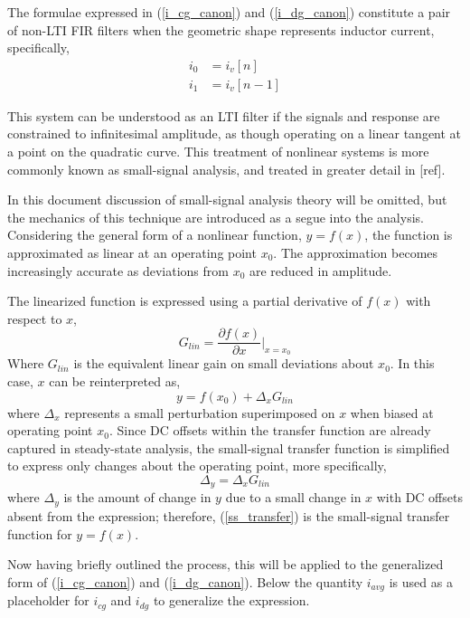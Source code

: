 \documentclass[conference]{IEEEtran}
\begin{document}
The formulae expressed in (\ref{i_cg_canon}) and (\ref{i_dg_canon}) constitute a pair of non-LTI FIR filters when the geometric shape represents inductor current, specifically,
\begin{align}
i_0 &= i_v[n] \nonumber \\
i_1 &= i_v[n-1]
\label{i0i1ivn}
\end{align}

This system can be understood as an LTI filter if the signals and response are constrained to infinitesimal amplitude, as though operating on a linear tangent at a point on the quadratic curve. This treatment of nonlinear systems is more commonly known as small-signal analysis, and treated in greater detail in [ref].

In this document discussion of small-signal analysis theory will be omitted, but the mechanics of this technique are introduced as a segue into the analysis.  Considering the general form of a nonlinear function, $y = f(x)$, the function is approximated as linear at an operating point $x_0$.  The approximation becomes increasingly accurate as deviations from $x_0$ are reduced in amplitude.

The linearized function is expressed using a partial derivative of $f(x)$ with respect to $x$,
\begin{equation}
	G_{lin} = \frac{\partial f(x)}{\partial x}\bigg|_{x=x_0}
\end{equation}
Where $G_{lin}$ is the equivalent linear gain on small deviations about $x_0$. In this case, $x$ can be reinterpreted as,
\begin{equation}
y = f(x_0) + \Delta_x G_{lin}
\end{equation}
where $\Delta_x$ represents a small perturbation superimposed on $x$ when biased at operating point $x_0$.  Since DC offsets within the transfer function are already captured in steady-state analysis, the small-signal transfer function is simplified to express only changes about the operating point, more specifically,
 \begin{equation}
 \Delta_y = \Delta_x G_{lin} \label{ss_transfer}
 \end{equation}
where $\Delta_y$ is the amount of change in $y$ due to a small change in $x$ with DC offsets absent from the expression; therefore, (\ref{ss_transfer}) is the small-signal transfer function for $y=f(x)$.

Now having briefly outlined the process, this will be applied to the generalized form of (\ref{i_cg_canon}) and (\ref{i_dg_canon}). Below the quantity $i_{avg}$ is used as a placeholder for $i_{cg}$ and $i_{dg}$ to generalize the expression.
\end{document}

